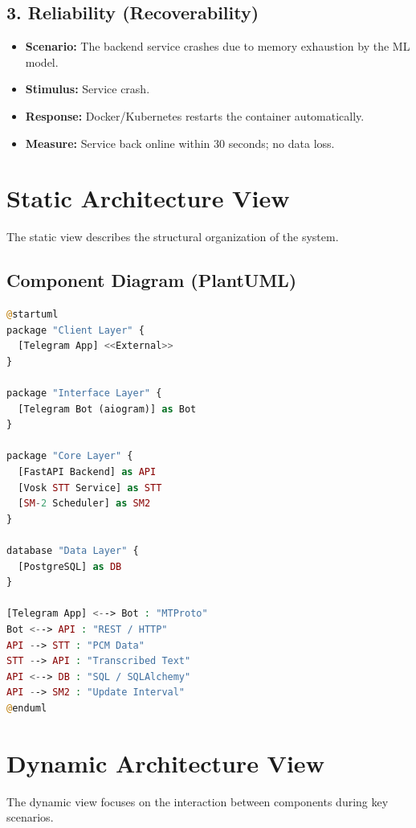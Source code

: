 \documentclass[12pt]{article}
\begin{document}
\subsection{3. Reliability (Recoverability)}
\begin{itemize}
    \item \textbf{Scenario:} The backend service crashes due to memory exhaustion by the ML model.
    \item \textbf{Stimulus:} Service crash.
    \item \textbf{Response:} Docker/Kubernetes restarts the container automatically.
    \item \textbf{Measure:} Service back online within 30 seconds; no data loss.
\end{itemize}

\section{Static Architecture View}

The static view describes the structural organization of the system.

\subsection{Component Diagram (PlantUML)}
\begin{lstlisting}[language=PHP, caption=Static Component Diagram]
@startuml
package "Client Layer" {
  [Telegram App] <<External>>
}

package "Interface Layer" {
  [Telegram Bot (aiogram)] as Bot
}

package "Core Layer" {
  [FastAPI Backend] as API
  [Vosk STT Service] as STT
  [SM-2 Scheduler] as SM2
}

database "Data Layer" {
  [PostgreSQL] as DB
}

[Telegram App] <--> Bot : "MTProto"
Bot <--> API : "REST / HTTP"
API --> STT : "PCM Data"
STT --> API : "Transcribed Text"
API <--> DB : "SQL / SQLAlchemy"
API --> SM2 : "Update Interval"
@enduml
\end{lstlisting}

\section{Dynamic Architecture View}

The dynamic view focuses on the interaction between components during key scenarios.
\end{document}
